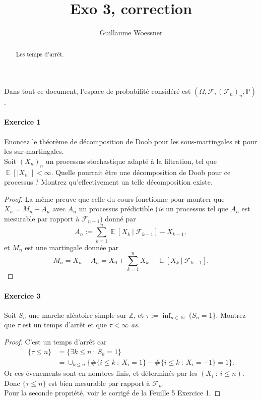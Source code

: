 \documentclass{article}
\title{Exo 3, correction}
\author{Guillaume Woessner}
\date{}                       %
\theoremstyle{definition}
\numberwithin{equation}{section}
\DeclareMathOperator{\N}{\mathbb{N}}
\DeclareMathOperator{\E}{\mathbb{E}}
\begin{document}
\maketitle                    %

\begin{abstract}
\begin{center}
Les temps d'arrêt.
\end{center}
\end{abstract}



Dans tout ce document, l'espace de probabilité considéré est $(\Omega,\mathcal{F},(\mathcal{F}_n)_n,\mathbb{P})$.



\paragraph{Exercice 1} 
Enoncez le théorème de décomposition de Doob pour les sous-martingales et pour les sur-martingales.\\
Soit $(X_n)_n$ un processus stochastique adapté à la filtration, tel que $\E[|X_n|]<\infty$. Quelle pourrait être une décomposition de Doob pour ce processus ? Montrez qu'effectivement un telle décomposition existe.

\begin{proof}
La même preuve que celle du cours fonctionne pour montrer que $X_n = M_n + A_n$ avec $A_n$ un processus prédictible (\textit{ie} un processus tel que $A_n$ est mesurable par rapport à $\mathcal{F}_{n-1}$) donné par 
$$A_n := \sum_{k=1}^n \E[X_k~|~\mathcal{F}_{k-1}]-X_{k-1},$$
et $M_n$ est une martingale donnée par 
$$M_n = X_n - A_n = X_0 + \sum_{k=1}^n X_k - \E[X_k~|~\mathcal{F}_{k-1}].$$
\end{proof}



\paragraph{Exercice 3} 
Soit $S_n$ une marche aléatoire simple sur $\mathbb{Z}$, et $\tau := \inf_{n\in\N} \{S_n=1\}$. Montrez que $\tau$ est un temps d'arrêt et que $\tau<\infty$ \textit{as}.

\begin{proof}
C'est un temps d'arrêt car 
\begin{align*}
    \{\tau \leq n\} &= \{\exists k\leq n ~:~S_k = 1\}\\
    &= \cup_{k\leq n}  \{ \#\{i\leq k~:~X_i =1\} - \#\{i\leq k ~:~X_i =-1\} = 1\}.
\end{align*}
Or ces évenements sont en nombres finis, et déterminés par les $(X_i ~:~ i\leq n)$. Donc $\{\tau\leq n\}$ est bien mesurable par rapport à $\mathcal{F}_n$.\\
Pour la seconde propriété, voir le corrigé de la Feuille 5 Exercice 1.
\end{proof}
\end{document}

